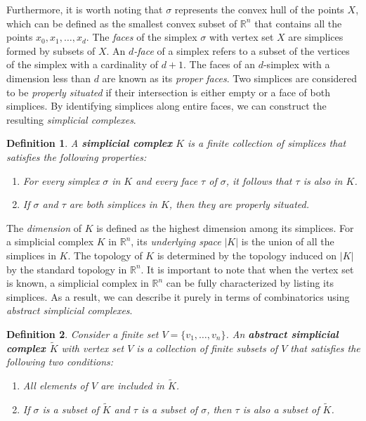 \documentclass{amsart}
\newtheorem{definition}{Definition}[section]
\begin{document}
Furthermore, it is worth noting that $\sigma$ represents the convex hull of the points $X$, which can be defined as the smallest convex subset of $\mathbb{R}^n$ that contains all the points $x_0, x_1, \ldots, x_d$. The \emph{faces} of the simplex $\sigma$ with vertex set $X$ are simplices formed by subsets of $X$. An \emph{$d$-face} of a simplex refers to a subset of the vertices of the simplex with a cardinality of $d+1$. The faces of an $d$-simplex with a dimension less than $d$ are known as its \emph{proper faces}. Two simplices are considered to be \emph{properly situated} if their intersection is either empty or a face of both simplices. By identifying simplices along entire faces, we can construct the resulting \emph{simplicial complexes}.

\begin{definition}
A \textbf{simplicial complex} $K$ is a finite collection of simplices that satisfies the following properties:
\begin{enumerate}
	\item For every simplex $\sigma$ in $K$ and every face $\tau$ of $\sigma$, it follows that $\tau$ is also in $K$.
	\item If $\sigma$ and $\tau$ are both simplices in $K$, then they are properly situated.
\end{enumerate}
\end{definition}

The \emph{dimension} of $K$ is defined as the highest dimension among its simplices. For a simplicial complex $K$ in $\mathbb{R}^n$, its \emph{underlying space} $\vert K \vert$ is the union of all the simplices in $K$. The topology of $K$ is determined by the topology induced on $\vert K \vert$ by the standard topology in $\mathbb{R}^n$. It is important to note that when the vertex set is known, a simplicial complex in $\mathbb{R}^n$ can be fully characterized by listing its simplices. As a result, we can describe it purely in terms of combinatorics using \emph{abstract simplicial complexes}.

\begin{definition}
Consider a finite set $V = \{v_1, \ldots, v_n\}$. An \textbf{abstract simplicial complex $\tilde{K}$} with vertex set $V$ is a collection of finite subsets of $V$ that satisfies the following two conditions:
\begin{enumerate}
	\item All elements of $V$ are included in $\tilde{K}$.
	\item If $\sigma$ is a subset of $\tilde{K}$ and $\tau$ is a subset of $\sigma$, then $\tau$ is also a subset of $\tilde{K}$.
\end{enumerate}
\end{definition}
\end{document}
